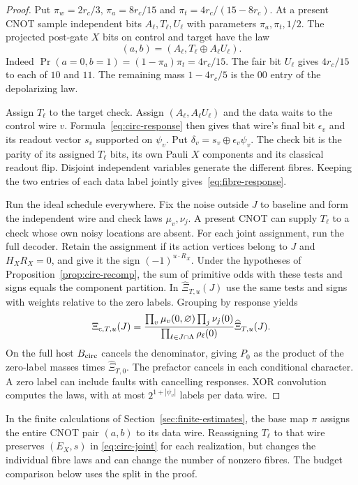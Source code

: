 \documentclass[10pt,twocolumn]{article}
\theoremstyle{definition}
\begin{document}
\begin{proof}
Put $\pi_w=2r_c/3$, $\pi_a=8r_c/15$ and
$\pi_t=4r_c/(15-8r_c)$. At a present CNOT sample independent bits
$A_\ell,T_\ell,U_\ell$ with parameters $\pi_a,\pi_t,1/2$.
The projected post-gate $X$ bits on control and target have the law
\[
 (a,b)=(A_\ell,T_\ell\oplus A_\ell U_\ell).
\]
Indeed $\Pr(a=0,b=1)=(1-\pi_a)\pi_t=4r_c/15$. The fair bit $U_\ell$
gives $4r_c/15$ to each of $10$ and $11$.
The remaining mass $1-4r_c/5$ is the $00$ entry of the depolarizing law.

Assign $T_\ell$ to the target check. Assign $(A_\ell,A_\ell U_\ell)$
and the data waits to the control wire $v$. Formula~\eqref{eq:circ-response}
then gives that wire's final bit $\epsilon_v$ and its readout vector
$s_v$ supported on $\psi_v$. Put $\delta_v=s_v\oplus\epsilon_v\psi_v$.
The check bit is the parity of its assigned $T_\ell$ bits, its own
Pauli $X$ components and its classical readout flip. Disjoint independent
variables generate the different fibres. Keeping the two entries of
each data label jointly gives~\eqref{eq:fibre-response}.

Run the ideal schedule everywhere. Fix the noise outside $J$ to baseline
and form the independent wire and check laws $\mu_v,\nu_j$. A present
CNOT can supply $T_\ell$ to a check whose own noisy locations are
absent. For each joint assignment, run the full decoder. Retain the
assignment if its action vertices belong to $J$ and $H_XR_X=0$, and
give it the sign $(-1)^{u\cdot R_X}$.
Under the hypotheses of Proposition~\ref{prop:circ-recomp}, the sum of
primitive odds with these tests and signs equals the component partition.
In $\widehat\Xi_{T,u}(J)$ use the same tests and signs with weights
relative to the zero labels. Grouping by response yields
\begin{equation}\label{eq:fibre-normalizer}
 \Xi_{{\rm c},T,u}(J)=
 \frac{\prod_v\mu_v(0,\varnothing)\prod_j\nu_j(0)}
      {\prod_{\ell\in J\cap\Lambda}\rho_\ell(0)}
 \widehat\Xi_{T,u}(J).
\end{equation}
On the full host $B_{\rm circ}$ cancels the denominator, giving $P_0$
as the product of the zero-label masses times $\widehat\Xi_{T,0}$.
The prefactor cancels in each conditional character. A zero label can
include faults with cancelling responses. XOR convolution computes
the laws, with at most $2^{1+|\psi_v|}$ labels per data wire.
\end{proof}

In the finite calculations of Section~\ref{sec:finite-estimates}, the
base map $\pi$ assigns the entire CNOT pair $(a,b)$ to its data wire.
Reassigning $T_\ell$ to that wire preserves $(E_X,s)$ in
\eqref{eq:circ-joint} for each realization, but changes the individual
fibre laws and can change the number of nonzero fibres. The budget
comparison below uses the split in the proof.
\end{document}
